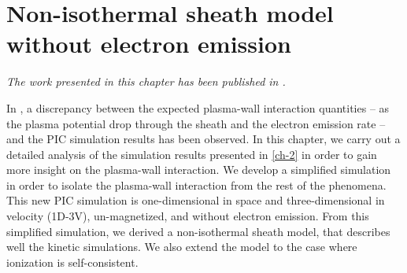 



\chapter{Non-isothermal sheath model without electron emission}
\label{ch-3}



\begin{Chabstract}
  
\emph{The work presented in this chapter has been published in  \citet{tavant2019}.}
\end{Chabstract}

\vspace{1ex}

\begin{Chabstract}
  
  In , a discrepancy between the expected plasma-wall interaction quantities -- as the plasma potential drop through the sheath and the electron emission rate -- and the \ac{PIC} simulation results has been observed.
  In this chapter, we carry out a detailed analysis of the simulation results presented in \cref{ch-2}  in order to gain more insight on the plasma-wall interaction.
  We develop a simplified simulation in order to isolate the plasma-wall interaction from the rest of the phenomena.
  This new \ac{PIC} simulation is one-dimensional in space and three-dimensional in velocity (\acs{1D}-\acs{3V}), un-magnetized, and without electron emission.
  From this simplified simulation, we derived a non-isothermal sheath model, that describes well the kinetic simulations.
  We also extend the model to the case where ionization is self-consistent.

\end{Chabstract}

\minitoc










